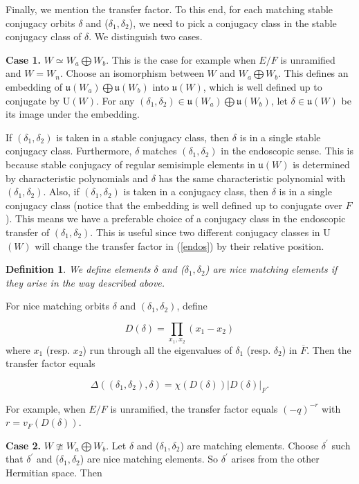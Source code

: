\documentclass[11pt, oneside,reqno]{amsart}   	%
\newtheorem{definition}[theorem]{Definition}
\begin{document}
Finally, we mention the transfer factor. To this end, for each matching stable conjugacy orbits  $\delta$ and \textup{(}$\delta_1,\delta_2$\textup{)}, we need to pick a conjugacy class in the stable conjugacy class of $\delta$. We distinguish two cases.

\textbf{Case 1.} $W \simeq W_{a} \bigoplus W_{b}$. This is the case for example when $E/F$ is unramified and $W=W_n$. Choose an isomorphism between $W$ and $W_{a}\bigoplus W_{b}$. This defines an embedding of $\mathfrak{u}(W_{a}) \bigoplus \mathfrak{u}(W_{b})$ into $\mathfrak{u}(W)$, which is well defined up to conjugate by U$(W)$. For any $(\delta_1,\delta_2) \in \mathfrak{u}(W_{a}) \bigoplus \mathfrak{u}(W_{b})$, let $\delta \in \mathfrak{u}(W)$ be its image under the embedding.

If $(\delta_1,\delta_2)$ is taken in a stable conjugacy class, then $\delta$ is in a single stable conjugacy class. Furthermore, $\delta$ matches $(\delta_1,\delta_2)$ in the endoscopic sense. This is because stable conjugacy of regular semisimple elements in $\mathfrak{u}(W)$ is determined by characteristic polynomials and $\delta$ has the same characteristic polynomial with $(\delta_1,\delta_2)$. Also, if $(\delta_1,\delta_2)$ is taken in a conjugacy class, then $\delta$ is in a single conjugacy class (notice that the embedding is well defined up to conjugate over $F$). This means we have a preferable choice of a conjugacy class in the endoscopic transfer of $(\delta_1,\delta_2)$. This is useful since two different conjugacy classes in U$(W)$ will change the transfer factor in (\ref{endos}) by their relative position.

\begin{definition} \label{nice}
We define elements $\delta$ and \textup{(}$\delta_1,\delta_2$\textup{)} are nice matching elements if they arise in the way described above.
\end{definition}

For nice matching orbits $\delta$ and $(\delta_1,\delta_2)$, define 

$$D(\delta)=\prod_{x_1,x_2}(x_1-x_2)$$ where $x_1$ (resp. $x_2$) run through all the eigenvalues of $\delta_1$ (resp. $\delta_2$) in $\overline{F}$.
Then the transfer factor equals

$$\Delta((\delta_1,\delta_2),\delta)=\chi(D(\delta))|D(\delta)|_F.$$

For example, when $E/F$ is unramified, the transfer factor equals $(-q)^{-r}$ with $r=v_F(D(\delta))$.


\textbf{Case 2.}  $W \ncong W_{a} \bigoplus W_{b}$. Let $\delta$ and \textup{(}$\delta_1,\delta_2$\textup{)} are matching elements. Choose $\delta^\prime$ such that $\delta^\prime$ and \textup{(}$\delta_1,\delta_2$\textup{)} are nice matching elements. So $\delta^\prime$ arises from the other Hermitian space. Then 
\end{document}
